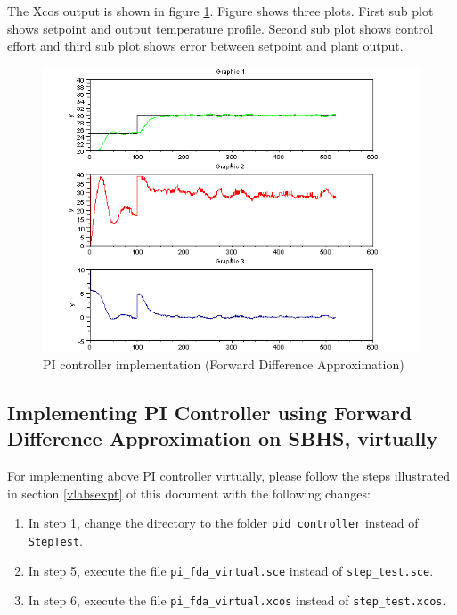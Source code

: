 The Xcos output is shown in figure \ref{pi_fda}.
Figure shows three plots. First sub plot shows setpoint and output temperature profile. Second sub plot shows 
control effort and third sub plot shows error between setpoint and plant output.

\begin{figure}
\centering
\includegraphics[width=0.6\linewidth]{pid_manual/pi_fda}
\caption{PI controller implementation (Forward Difference Approximation)}
\label{pi_fda}
\end{figure}

\subsection{Implementing PI Controller using Forward Difference Approximation on SBHS, virtually}
For implementing above PI controller virtually, please follow the steps illustrated in section \ref{vlabsexpt} of 
this document with the following changes:
\begin{enumerate}

\item In step 1, change the directory to the folder {\tt pid\_controller} instead of {\tt StepTest}.
\item In step 5, execute the file {\tt pi\_fda\_virtual.sce} instead of {\tt step\_test.sce}.
\item In step 6, execute the file {\tt pi\_fda\_virtual.xcos} instead of {\tt step\_test.xcos}.

\end{enumerate}

\
